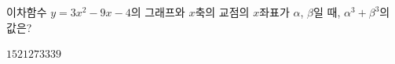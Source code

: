 이차함수 $y=3x^2-9x-4$의 그래프와 $x$축의 교점의 $x$좌표가 $\alpha$, $\beta$일 때, $\alpha^3+\beta^3$의 값은?
\begin{choices32}{$15$}{$21$}{$27$}{$33$}{$39$}\end{choices32}
